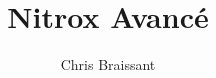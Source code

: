 \documentclass[aspectratio=1610,english,12pt]{beamer}
\author[]{Chris Braissant}
\title[]{Nitrox Avancé}
\institute{Ban's Diving Resort}
\begin{document}
\begin{frame}
	\maketitle
\end{frame}









\end{document}
